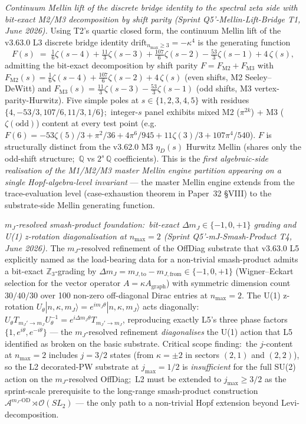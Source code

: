 \documentclass[11pt,a4paper]{article}
\theoremstyle{plain}
\theoremstyle{definition}
\begin{document}
\emph{Continuum Mellin lift of the discrete bridge identity to the
spectral zeta side with bit-exact M2/M3 decomposition by shift parity
(Sprint Q5'-Mellin-Lift-Bridge T1, June 2026).}  Using
T2's quartic closed form, the continuum Mellin lift of the v3.63.0
L3 discrete bridge identity $\mathrm{drift}_{n_{\max} \ge 3} = -\kappa^4$
is the generating function
\[
F(s) \;=\;
\tfrac{1}{6}\zeta(s-4) + \tfrac{11}{3}\zeta(s-3) +
\tfrac{107}{6}\zeta(s-2) - \tfrac{53}{3}\zeta(s-1) + 4\,\zeta(s),
\]
admitting the bit-exact decomposition by shift parity
$F = F_{\mathrm{M2}} + F_{\mathrm{M3}}$ with
$F_{\mathrm{M2}}(s) = \tfrac{1}{6}\zeta(s-4) + \tfrac{107}{6}\zeta(s-2) + 4\,\zeta(s)$
(even shifts, M2 Seeley--DeWitt) and
$F_{\mathrm{M3}}(s) = \tfrac{11}{3}\zeta(s-3) - \tfrac{53}{3}\zeta(s-1)$
(odd shifts, M3 vertex-parity-Hurwitz). Five simple poles at
$s \in \{1, 2, 3, 4, 5\}$ with residues
$\{4, -53/3, 107/6, 11/3, 1/6\}$;\ integer-$s$ panel exhibits mixed
M2 ($\pi^{2k}$) + M3 ($\zeta(\text{odd})$) content at every test point
(e.g.\ $F(6) = -53\zeta(5)/3 + \pi^2/36 + 4\pi^6/945 + 11\zeta(3)/3 + 107\pi^4/540$).
$F$ is structurally distinct from the v3.62.0 M3 $\eta_D(s)$ Hurwitz
Mellin (shares only the odd-shift structure;\ $\mathbb{Q}$
vs $2^s\,\mathbb{Q}$ coefficients).  This is the \emph{first
algebraic-side realisation of the M1/M2/M3 master Mellin engine
partition appearing on a single Hopf-algebra-level invariant} — the
master Mellin engine extends from the trace-evaluation level
(case-exhaustion theorem in Paper~32 \S VIII) to the substrate-side
Mellin generating function.

\emph{$m_J$-resolved smash-product foundation:\ bit-exact $\Delta m_J \in \{-1, 0, +1\}$ grading and U(1) z-rotation diagonalisation at $n_{\max} = 2$ (Sprint Q5'-mJ-Smash-Product T4, June 2026).}  The
$m_J$-resolved refinement of the OffDiag substrate that v3.63.0 L5
explicitly named as the load-bearing data for a non-trivial smash-product
admits a bit-exact $\mathbb{Z}_3$-grading by
$\Delta m_J = m_{J, \mathrm{to}} - m_{J, \mathrm{from}} \in \{-1, 0, +1\}$
(Wigner--Eckart selection for the vector operator $A = \kappa A_{\mathrm{graph}}$)
with symmetric dimension count $30 / 40 / 30$ over 100 non-zero
off-diagonal Dirac entries at $n_{\max} = 2$. The U(1) z-rotation
$U_\theta |n, \kappa, m_J\rangle = e^{i m_J \theta} |n, \kappa, m_J\rangle$
acts diagonally:\
$U_\theta T_{m_J' \to m_J} U_\theta^{-1} = e^{i \Delta m_J \theta} T_{m_J' \to m_J}$,
reproducing exactly L5's three phase factors
$\{1, e^{i\theta}, e^{-i\theta}\}$ — the $m_J$-resolved refinement
\emph{diagonalises} the U(1) action that L5 identified as broken on the
basic substrate.  Critical scope finding:\ the $j$-content at
$n_{\max} = 2$ includes $j = 3/2$ states (from $\kappa = \pm 2$ in
sectors $(2, 1)$ and $(2, 2)$), so the L2 decorated-PW substrate at
$j_{\max} = 1/2$ is \emph{insufficient} for the full SU(2) action on
the $m_J$-resolved OffDiag;\ L2 must be extended to $j_{\max} \ge 3/2$
as the sprint-scale prerequisite to the
long-range smash-product construction
$\mathcal{A}^{m_J\text{-OD}} \rtimes \mathcal{O}(SL_2)$ — the only path
to a non-trivial Hopf extension beyond Levi-decomposition.
\end{document}
